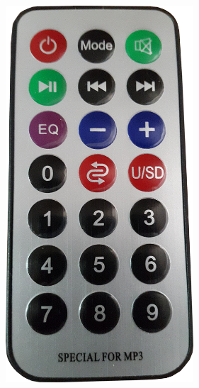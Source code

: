 \documentclass[a4paper, 12pt]{article}
\begin{document}
    \begin{figure}[H]
    \centering
    \includegraphics[width=7cm]{ir}
    \end{figure}



\end{document}
